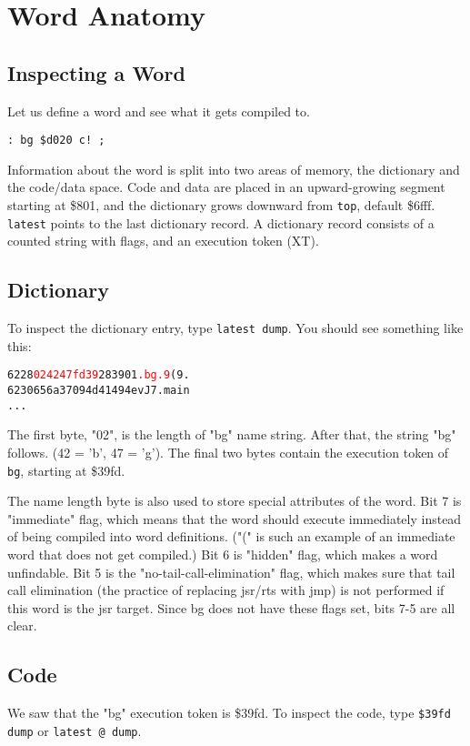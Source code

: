 \chapter{Word Anatomy}

\section{Inspecting a Word}

Let us define a word and see what it gets compiled to.

\begin{verbatim}
: bg $d020 c! ;
\end{verbatim}

Information about the word is split into two areas of memory, the dictionary and the code/data space. Code and data are placed in an upward-growing segment starting at \$801, and the dictionary grows downward from \texttt{top}, default \$6fff. \texttt{latest} points to the last dictionary record. A dictionary record consists of a counted string with flags, and an execution token (XT).

\section{Dictionary}
To inspect the dictionary entry, type \texttt{latest dump}. You should see something like this:

\begin{alltt}
6228  \textcolor{red}{02 42 47 fd 39} 28 39 01 \textcolor{red}{.bg.9}(9.
6230  65 6a 37 09 4d 41 49 4e vJ7.main
...
\end{alltt}

The first byte, "02", is the length of "bg" name string. After that, the string "bg" follows. (42 = 'b', 47 = 'g'). The final two bytes contain the execution token of \texttt{bg}, starting at \$39fd.

The name length byte is also used to store special attributes of the word. Bit 7 is "immediate" flag, which means that the word should execute immediately instead of being compiled into word definitions. ("(" is such an example of an immediate word that does not get compiled.) Bit 6 is "hidden" flag, which makes a word unfindable. Bit 5 is the "no-tail-call-elimination" flag, which makes sure that tail call elimination (the practice of replacing jsr/rts with jmp) is not performed if this word is the jsr target. Since bg does not have these flags set, bits 7-5 are all clear.

\section{Code}
We saw that the "bg" execution token is \$39fd. To inspect the code, type \texttt{\$39fd dump} or \texttt{latest @ dump}.

